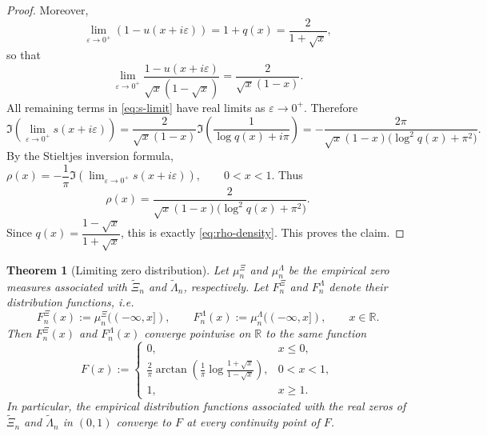 \documentclass[11pt,twoside]{article}
\newtheorem{theorem}{Theorem}[section]
\numberwithin{equation}{section}
\begin{document}
\begin{proof}
Moreover,
\[
\lim_{\varepsilon\to0^+}(1-u(x+i\varepsilon))
=
1+q(x)
=
\frac{2}{1+\sqrt{x}},
\]
so that
\[
\lim_{\varepsilon\to0^+}\frac{1-u(x+i\varepsilon)}{\sqrt{x}(1-\sqrt{x})}
=
\frac{2}{\sqrt{x}(1-x)}.
\]
All remaining terms in \eqref{eq:s-limit} have real limits as \(\varepsilon\to0^+\). Therefore
\[
\Im\!\left(\lim_{\varepsilon\to0^+} s(x+i\varepsilon)\right)
=
\frac{2}{\sqrt{x}(1-x)}
\Im\!\left(\frac{1}{\log q(x)+i\pi}\right)
=
-\frac{2\pi}{\sqrt{x}(1-x)\bigl(\log^2 q(x)+\pi^2\bigr)}.
\]
By the Stieltjes inversion formula,
\(
\rho(x)
=
-\dfrac{1}{\pi}\Im\!\left(\displaystyle\lim_{\varepsilon\to0^+} s(x+i\varepsilon)\right),
\qquad 0<x<1.
\)
Thus
\[
\rho(x)
=
\frac{2}{\sqrt{x}(1-x)\bigl(\log^2 q(x)+\pi^2\bigr)}.
\]
Since \(q(x)=\dfrac{1-\sqrt{x}}{1+\sqrt{x}}\), this is exactly \eqref{eq:rho-density}. This proves the claim.
\end{proof}

\begin{theorem}[Limiting zero distribution]\label{thm:limiting-zero-distribution}
Let \(\mu_n^{\Xi}\) and \(\mu_n^{\Lambda}\) be the empirical zero measures associated with
\(\widetilde{\Xi}_n\) and \(\widetilde{\Lambda}_n\), respectively. Let
\(\displaystyle F_n^{\Xi}\) and \(\displaystyle F_n^{\Lambda}\) denote their distribution functions, i.e.
\[
F_n^{\Xi}(x):=\mu_n^{\Xi}((-\infty,x]),
\qquad
F_n^{\Lambda}(x):=\mu_n^{\Lambda}((-\infty,x]),
\qquad x\in\mathbb{R}.
\]
Then \(F_n^{\Xi}(x)\) and \(F_n^{\Lambda}(x)\) converge pointwise on \(\mathbb{R}\) to the same function
\[
F(x):=
\begin{cases}
0, & x\le 0,\\[1mm]
\displaystyle \frac{2}{\pi}\arctan\!\left(
  \frac{1}{\pi}\log\frac{1+\sqrt{x}}{1-\sqrt{x}}
\right), & 0<x<1,\\[3mm]
1, & x\ge 1.
\end{cases}
\]
In particular, the empirical distribution functions associated with the real zeros of
\(\widetilde{\Xi}_n\) and \(\widetilde{\Lambda}_n\) in \((0,1)\) converge to \(F\) at every
continuity point of \(F\).
\end{theorem}
\end{document}
